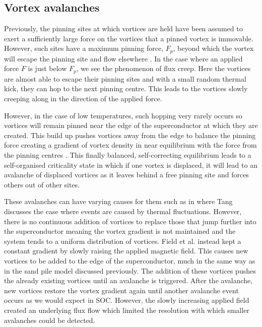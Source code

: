 \documentclass{article}
\numberwithin{equation}{section}
\begin{document}
\subsection{Vortex avalanches}
Previously, the pinning sites at which vortices are held have been assumed to exert a sufficiently large force on the vortices that a pinned vortex is immovable. However, such sites have a maximum pinning force, $F_p$, beyond which the vortex will escape the pinning site and flow elsewhere \cite{Poole2014Superconductivity}. In the case where an applied force $F$ is just below $F_p$, we see the phenomenon of flux creep. Here the vortices are almost able to escape their pinning sites and with a small random thermal kick, they can hop to the next pinning centre. This leads to the vortices slowly creeping along in the direction of the applied force.

However, in the case of low temperatures, such hopping very rarely occurs so vortices will remain pinned near the edge of the superconductor at which they are created. This build up pushes vortices away from the edge to balance the pinning force creating a gradient of vortex density in near equilibrium with the force from the pinning centres \cite{Tang1993SOCState}. This finally balanced, self-correcting equilibrium leads to a self-organised criticality state in which if one vortex is displaced, it will lead to an avalanche of displaced vortices as it leaves behind a free pinning site and forces others out of other sites.

These avalanches can have varying causes for them such as in \cite{Tang1993SOCState} where Tang discusses the case where events are caused by thermal fluctuations. However, there is no continuous addition of vortices to replace those that jump further into the superconductor meaning the vortex gradient is not maintained and the system tends to a uniform distribution of vortices. Field et al. \cite{Field1995SuperconductingAvalanches} instead kept a constant gradient by slowly raising the applied magnetic field. This causes new vortices to be added to the edge of the superconductor, much in the same way as in the sand pile model discussed previously. The addition of these vortices pushes the already existing vortices until an avalanche is triggered. After the avalanche, new vortices restore the vortex gradient again until another avalanche event occurs as we would expect in SOC. However, the slowly increasing applied field created an underlying flux flow which limited the resolution with which smaller avalanches could be detected.
\end{document}
